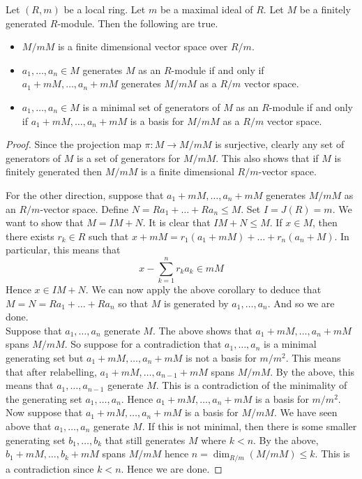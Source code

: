 \documentclass[a4paper]{article}
\begin{document}
\begin{crl}{}{} Let $(R,m)$ be a local ring. Let $m$ be a maximal ideal of $R$. Let $M$ be a finitely generated $R$-module. Then the following are true. 
\begin{itemize}
\item $M/mM$ is a finite dimensional vector space over $R/m$. 
\item $a_1,\dots,a_n\in M$ generates $M$ as an $R$-module if and only if $a_1+mM,\dots,a_n+mM$ generates $M/mM$ as a $R/m$ vector space. 
\item $a_1,\dots,a_n\in M$ is a minimal set of generators of $M$ as an $R$-module if and only if $a_1+mM,\dots,a_n+mM$ is a basis for $M/mM$ as a $R/m$ vector space. 
\end{itemize} 
\begin{proof}
Since the projection map $\pi:M\to M/mM$ is surjective, clearly any set of generators of $M$ is a set of generators for $M/mM$. This also shows that if $M$ is finitely generated then $M/mM$ is a finite dimensional $R/m$-vector space. 

For the other direction, suppose that $a_1+mM,\dots,a_n+mM$ generates $M/mM$ as an $R/m$-vector space. Define $N=Ra_1+\dots+Ra_n\leq M$. Set $I=J(R)=m$. We want to show that $M=IM+N$. It is clear that $IM+N\leq M$. If $x\in M$, then there exists $r_k\in R$ such that $x+mM=r_1(a_1+mM)+\dots+r_n(a_n+M)$. In particular, this means that $$x-\sum_{k=1}^nr_ka_k\in mM$$ Hence $x\in IM+N$. We can now apply the above corollary to deduce that $M=N=Ra_1+\dots+Ra_n$ so that $M$ is generated by $a_1,\dots,a_n$. And so we are done. \\

Suppose that $a_1,\dots,a_n$ generate $M$. The above shows that $a_1+mM,\dots,a_n+mM$ spans $M/mM$. So suppose for a contradiction that $a_1,\dots,a_n$ is a minimal generating set but $a_1+mM,\dots,a_n+mM$ is not a basis for $m/m^2$. This means that after relabelling, $a_1+mM,\dots,a_{n-1}+mM$ spans $M/mM$. By the above, this means that $a_1,\dots,a_{n-1}$ generate $M$. This is a contradiction of the minimality of the generating set $a_1,\dots,a_n$. Hence $a_1+mM,\dots,a_n+mM$ is a basis for $m/m^2$. \\

Now suppose that $a_1+mM,\dots,a_n+mM$ is a basis for $M/mM$. We have seen above that $a_1,\dots,a_n$ generate $M$. If this is not minimal, then there is some smaller generating set $b_1,\dots,b_k$ that still generates $M$ where $k<n$. By the above, $b_1+mM,\dots,b_k+mM$ spans $M/mM$ hence $n=\dim_{R/m}(M/mM)\leq k$. This is a contradiction since $k<n$. Hence we are done. 
\end{proof}
\end{crl}
\end{document}
